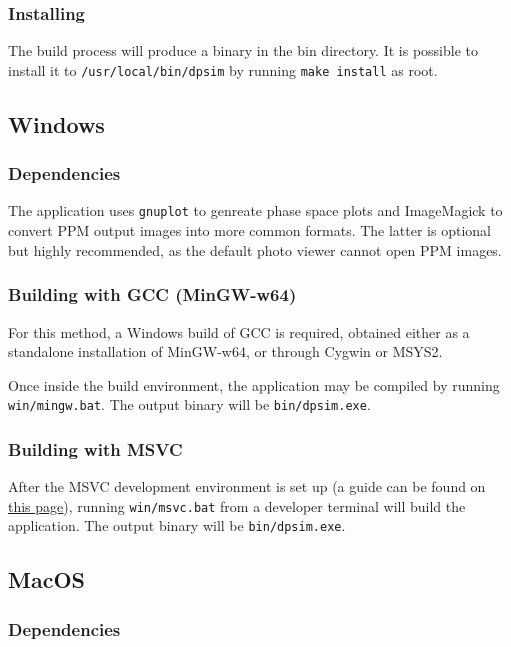\documentclass[a4paper,12pt]{article}
\begin{document}
\subsubsection{Installing}

The build process will produce a binary in the bin directory.
It is possible to install it to \texttt{/usr/local/bin/dpsim}
by running \texttt{make install} as root.

\subsection{Windows}

\subsubsection{Dependencies}
The application uses \texttt{gnuplot} to genreate phase space plots and ImageMagick to
convert PPM output images into more common formats. The latter is optional but
highly recommended, as the default photo viewer cannot open PPM images.

\subsubsection{Building with GCC (MinGW-w64)}

For this method, a Windows build of GCC is required, obtained either as
a standalone installation of MinGW-w64, or through Cygwin or MSYS2.

Once inside the build environment, the application may be compiled by
running \texttt{win/mingw.bat}. The output binary will be \texttt{bin/dpsim.exe}.

\subsubsection{Building with MSVC}

After the MSVC development environment is set up (a guide can be found on
\href{https://learn.microsoft.com/en-us/cpp/build/walkthrough-compile-a-c-program-on-the-command-line}{this page}),
running \texttt{win/msvc.bat} from a developer terminal will build the application.
The output binary will be \texttt{bin/dpsim.exe}.

\subsection{MacOS}

\subsubsection{Dependencies}
\end{document}
